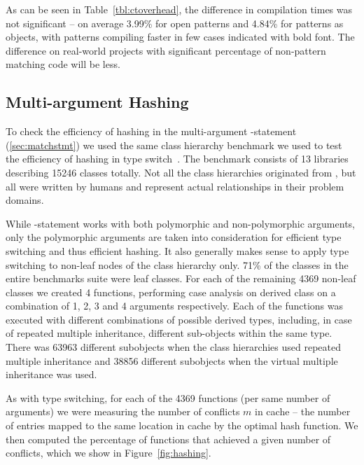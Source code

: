 As can be seen in Table~\ref{tbl:ctoverhead},  the difference in compilation times was not significant -- on 
average 3.99\% for open patterns and 4.84\% for patterns as objects, with 
patterns compiling faster in few cases indicated with bold font. The difference 
on real-world projects with significant percentage of non-pattern matching code 
will be less.

\subsection{Multi-argument Hashing}
\label{sec:morton}

To check the efficiency of hashing in the multi-argument -statement 
(\textsection\ref{sec:matchstmt}) we used the same class hierarchy benchmark we 
used to test the efficiency of hashing in type switch~\cite[]{TS12}.
The benchmark consists of 13 libraries describing 15246 classes totally. Not all 
the class hierarchies originated from \Cpp{}, but all were written by humans and 
represent actual relationships in their problem domains.

While -statement works with both polymorphic and non-polymorphic 
arguments, only the polymorphic arguments are taken into consideration for 
efficient type switching and thus efficient hashing. It also generally makes 
sense to apply type switching to non-leaf nodes of the class hierarchy only. 71\%
of the classes in the entire benchmarks suite were leaf classes. For each of the 
remaining 4369 non-leaf classes we created 4 functions, performing case analysis 
on derived class on a combination of 1, 2, 3 and 4 arguments respectively. Each 
of the functions was executed with different combinations of possible derived 
types, including, in case of repeated multiple inheritance, different 
sub-objects within the same type. There was 63963 different subobjects when the 
class hierarchies used repeated multiple inheritance and 38856 different 
subobjects when the virtual multiple inheritance was used.

As with type switching, for each of the 4369 functions (per same number of 
arguments) we were measuring the number of conflicts $m$ in cache -- the number 
of entries mapped to the same location in cache by the optimal hash function. 
We then computed the percentage of functions that achieved a given number of 
conflicts, which we show in Figure~\ref{fig:hashing}.

